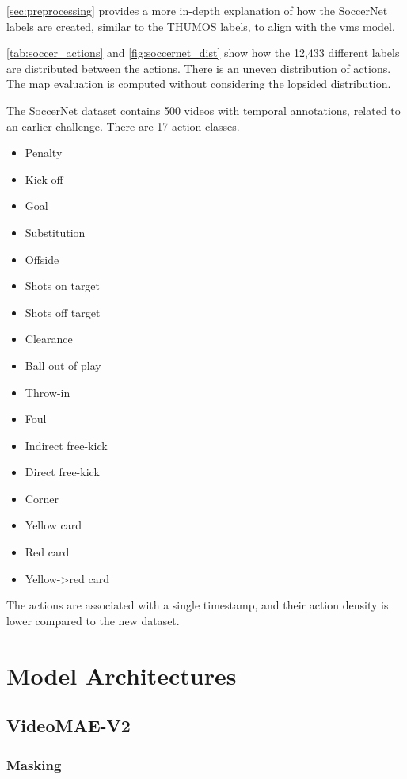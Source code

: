 \cref{sec:preprocessing} provides a more in-depth explanation of how the SoccerNet labels are created, similar to the THUMOS labels, to align with the \acrshort{vms} model. 

\cref{tab:soccer_actions} and \cref{fig:soccernet_dist} show how the 12,433 different labels are distributed between the actions. There is an uneven distribution of actions. The \acrshort{map} evaluation is computed without considering the lopsided distribution.

The SoccerNet dataset contains 500 videos with temporal annotations, related to an earlier challenge. There are 17 action classes.
\begin{itemize}
    \item Penalty
    \item Kick-off
    \item Goal
    \item Substitution
    \item Offside
    \item Shots on target
    \item Shots off target
    \item Clearance
    \item Ball out of play
    \item Throw-in
    \item Foul
    \item Indirect free-kick
    \item Direct free-kick
    \item Corner
    \item Yellow card
    \item Red card
    \item Yellow->red card
\end{itemize}

The actions are associated with a single timestamp, and their action density is lower compared to the new dataset.

\section{Model Architectures}
\label{sec:model_architectures}

\subsection{VideoMAE-V2}
\label{ssec:videomae_v2}

\subsubsection{Masking}

